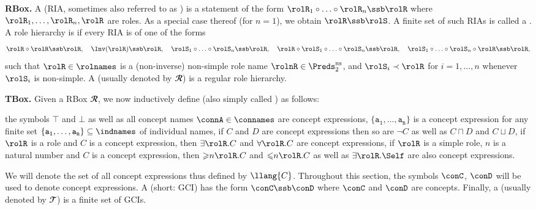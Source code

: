 \medskip\noindent\textbf{RBox. } 
%
A  (RIA, sometimes also referred to as
) is a statement of the form $\rolR_1 \circ
\ldots \circ \rolR_n \ssb \rolR$ where $\rolR_1,\ldots,\rolR_n,\rolR$ are roles. As a special case thereof (for $n=1$), we obtain  $\rolR \ssb \rolS$. A finite set of such RIAs is called a .
%
%
A role hierarchy is  if every RIA is of one of the forms
$$\rolR\circ\rolR\ssb \rolR,\quad
\Inv(\rolR) \ssb \rolR, \quad
\rolS_1\circ\ldots\circ\rolS_n\ssb \rolR, \quad
\rolR\circ\rolS_1\circ\ldots\circ\rolS_n\ssb \rolR, \quad
\rolS_1\circ\ldots\circ\rolS_n\circ\rolR\ssb \rolR,$$%
such that $\rolR\in\rolnames$ is a (non-inverse) non-simple role name $\rolnR \in \Preds^\mathrm{ns}_2$, and $\rolS_i\prec\rolR$ for $i=1, \ldots, n$ whenever $\rolS_i$ is non-simple.
%
A \SROIQ{}
 (usually denoted by $\mathbfcal{R}$) is %
a regular role hierarchy.

\medskip\noindent\textbf{TBox. } 
%
Given a \SROIQ{} RBox $\mathbfcal{R}$, we now inductively define  (also simply called ) as follows:
\begin{itemize}
\itemb
the symbols $\top$ and $\bot$ as well as all concept names $\connA\in \connames$ are concept expressions,
\itemb
$\{\mathtt{a_1}, \ldots, \mathtt{a_n}\}$ is a concept expression for any finite set $\{\mathtt{a_1}, \ldots, \mathtt{a_n}\}\subseteq \indnames$ of individual names,
\itemb
if $C$ and $D$ are concept expressions then so are $\neg C$ as well as $C\sqcap D$ and $C\sqcup D$,
\itemb
if $\rolR$ is a role and $C$ is a concept expression, then $\exists \rolR. C$ and $\forall \rolR. C$ are concept expressions,
\itemb
if $\rolR$ is a simple role, $n$ is a natural number and $C$ is a concept expression, then  ${\geqslant}n\rolR. C$ and ${\leqslant}n\rolR. C$ as well as $\exists\rolR.\Self$ are also concept expressions.
\end{itemize}
We will denote the set of all concept expressions thus defined by $ \llang{C}$. Throughout this section, the symbols $\conC$, $\conD$ will be used to denote concept expressions.
%
A  (short: GCI) has the form $\conC \ssb \conD$ where $\conC$ and $\conD$ are concepts.
%
Finally, a \SROIQ{}  (usually denoted by $\mathbfcal{T}$) is a finite set of GCIs.

